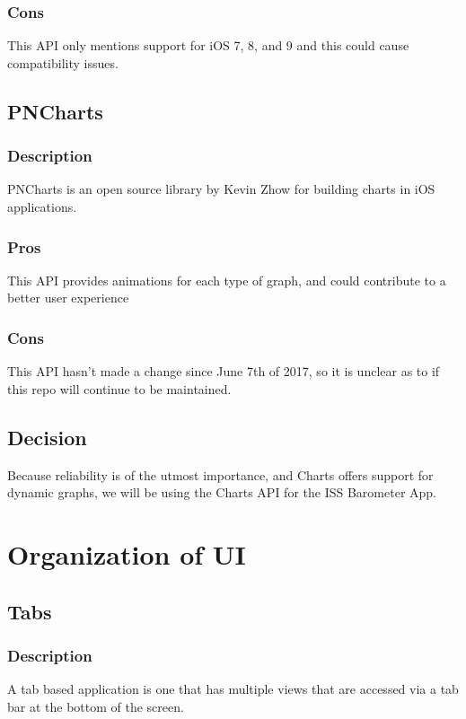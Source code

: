\documentclass[onecolumn, draftclsnofoot,10pt, compsoc]{IEEEtran}
\begin{document}
\subsubsection*{Cons}
This API only mentions support for iOS 7, 8, and 9 and this could cause compatibility issues.

\subsection{PNCharts}
\subsubsection*{Description}
PNCharts is an open source library by Kevin Zhow for building charts in iOS applications.

\subsubsection*{Pros}
This API provides animations for each type of graph, and could contribute to a better user experience

\subsubsection*{Cons}
This API hasn't made a change since June 7th of 2017, so it is unclear as to if this repo will continue to be maintained.

\subsection{Decision}
Because reliability is of the utmost importance, and Charts offers support for dynamic graphs, we will be using the Charts API for the ISS Barometer App.

\section{Organization of UI}

\subsection{Tabs}
\subsubsection*{Description}
A tab based application is one that has multiple views that are accessed via a tab bar at the bottom of the screen.
\end{document}
